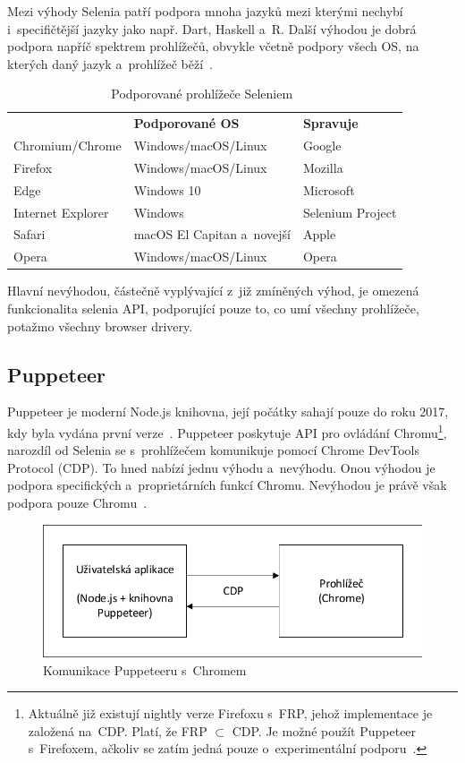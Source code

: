 \documentclass[12pt, a4paper, twoside]{article}
\begin{document}
	Mezi výhody Selenia patří podpora mnoha jazyků mezi kterými nechybí i~specifičtější jazyky jako např. Dart, Haskell a~R. Další výhodou je dobrá podpora napříč spektrem prohlížečů, obvykle včetně podpory všech OS, na kterých daný jazyk a~prohlížeč běží~\cite{seleniumDocs, seleniumEcosystem}.
	
	\begin{table}[H]
		\centering
		\begin{tabular}{ l|l|l } 
			\rowcolor{tableHeadingBackground}
			\multicolumn{1}{l}{\textbf{Prohlížeč}} & \multicolumn{1}{l}{\textbf{Podporované OS}} & \multicolumn{1}{l}{\textbf{Spravuje}}  \\
			Chromium/Chrome & Windows/macOS/Linux & Google \\ 
			Firefox & Windows/macOS/Linux & Mozilla \\ 
			Edge & Windows 10 & Microsoft \\
			Internet Explorer & Windows & Selenium Project \\
			Safari & macOS El Capitan a~novejší & Apple \\
			Opera & Windows/macOS/Linux & Opera
		\end{tabular}
		\caption{Podporované prohlížeče Seleniem~\cite{seleniumDocs}}
	\end{table}
	
	Hlavní nevýhodou, částečně vyplývající z~již zmíněných výhod, je omezená funkcionalita selenia API, podporující pouze to, co umí všechny prohlížeče, potažmo všechny browser drivery.
	\subsection{Puppeteer}
	\label{sub_sec:Puppeteer}
	Puppeteer je moderní Node.js knihovna, její počátky sahají pouze do roku 2017, kdy byla vydána první verze~\cite{puppeteerFirstRelease}. Puppeteer poskytuje API pro ovládání Chromu\footnote{Aktuálně již existují nightly verze Firefoxu s~FRP, jehož implementace je založená na~CDP. Platí, že FRP $\subset$ CDP. Je možné použít Puppeteer s~Firefoxem, ačkoliv se zatím jedná pouze o~experimentální podporu~\cite{firefoxRemoteProtocol, firefoxRemoteProtocol2}.}, narozdíl od Selenia se s~prohlížečem komunikuje pomocí Chrome DevTools Protocol (CDP). To hned nabízí jednu výhodu a~nevýhodu. Onou výhodou je podpora specifických a~proprietárních funkcí Chromu. Nevýhodou je právě však podpora pouze Chromu~\cite{puppeteerMainPage}.
	\begin{figure}[H]
		\centering	
		\includegraphics[width=1.0\textwidth]{puppeteerCom.pdf}
		\caption{Komunikace Puppeteeru s~Chromem}
	\end{figure}
\end{document}
